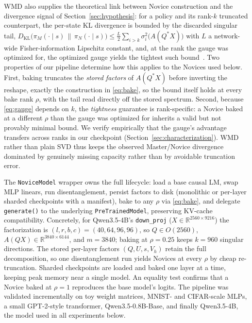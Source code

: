 \documentclass[times, 10pt,twocolumn]{article}
\begin{document}
WMD also supplies the theoretical link between Novice construction and the
divergence signal of Section~\ref{sec:hypothesis}: for a policy and its rank-$k$ truncated
counterpart, the per-state KL divergence is bounded by the discarded singular
tail, $D_{\mathrm{KL}}\bigl(\pi_M(\cdot \mid s)\,\|\,\pi_N(\cdot \mid s)\bigr)
\le \tfrac{L}{2} \sum_{i>k} \sigma_i^2\bigl(A(Q^{*}X)\bigr)$ with $L$ a
network-wide Fisher-information Lipschitz constant, and, at the rank the gauge
was optimized for, the optimized gauge yields the tightest such
bound~\cite{till2026introspection}. Two properties of our pipeline determine
how this applies to the Novices used below. First, baking truncates the
\emph{stored factors} of $A(Q^{*}X)$ before inverting the reshape, exactly the
construction in \eqref{eq:bake}, so the bound itself holds at every bake rank
$\rho$, with the tail read directly off the stored spectrum. Second, because
\eqref{eq:gauge} depends on $k$, the \emph{tightness} guarantee is
rank-specific: a Novice baked at a different $\rho$ than the gauge was
optimized for inherits a valid but not provably minimal bound. We verify
empirically that the gauge's advantage transfers across ranks in our
checkpoint (Section~\ref{sec:characterization}). WMD rather than plain SVD
thus keeps the observed Master/Novice divergence dominated by genuinely
missing capacity rather than by avoidable truncation error.


The \texttt{NoviceModel} wrapper owns the full lifecycle: load a base causal
LM, swap MLP linears, run disentanglement, persist factors to disk (monolithic
or per-layer sharded checkpoints with a manifest), bake to any $\rho$ via
\eqref{eq:bake}, and delegate \texttt{generate()} to the underlying
\texttt{PreTrainedModel}, preserving KV-cache compatibility. Concretely, for
Qwen3.5-4B's \texttt{down\_proj} ($X \in \mathbb{R}^{2560 \times 9216}$) the
factorization is $(l,r,b,c) = (40,64,96,96)$, so $Q \in O(2560)$,
$A(QX) \in \mathbb{R}^{3840 \times 6144}$, and $m = 3840$; baking at
$\rho{=}0.25$ keeps $k{=}960$ singular directions. The stored per-layer
factors $(Q, U, s, V_h)$ retain the full decomposition, so one
disentanglement run yields Novices at every $\rho$ by cheap re-truncation.
Sharded checkpoints are loaded and baked one layer at a time, keeping peak
memory near a single model. An equality test confirms that a Novice baked at
$\rho{=}1$ reproduces the base model's logits.
The pipeline was validated incrementally on toy weight matrices, MNIST- and
CIFAR-scale MLPs, a small GPT-2-style transformer, Qwen3.5-0.8B-Base, and
finally Qwen3.5-4B, the model used in all experiments below.
\end{document}

